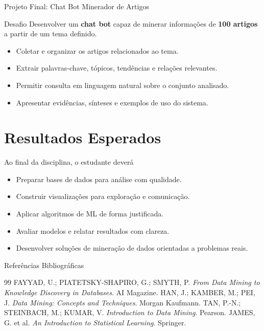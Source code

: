 \documentclass[aspectratio=169]{beamer}
\begin{document}
\begin{frame}{Projeto Final: Chat Bot Minerador de Artigos}
    \small
    \begin{alertblock}{Desafio}
        Desenvolver um \textbf{chat bot} capaz de minerar informações de \textbf{100 artigos} a partir de um tema definido.
    \end{alertblock}

    \begin{itemize}
        \item Coletar e organizar os artigos relacionados ao tema.
        \item Extrair palavras-chave, tópicos, tendências e relações relevantes.
        \item Permitir consulta em linguagem natural sobre o conjunto analisado.
        \item Apresentar evidências, sínteses e exemplos de uso do sistema.
    \end{itemize}
\end{frame}

\section{Resultados Esperados}

\begin{frame}{Ao final da disciplina, o estudante deverá}
    \begin{itemize}
        \item Preparar bases de dados para análise com qualidade.
        \item Construir visualizações para exploração e comunicação.
        \item Aplicar algoritmos de ML de forma justificada.
        \item Avaliar modelos e relatar resultados com clareza.
        \item Desenvolver soluções de mineração de dados orientadas a problemas reais.
    \end{itemize}
\end{frame}

\begin{frame}{Referências Bibliográficas}
    \begin{thebibliography}{99}
         FAYYAD, U.; PIATETSKY-SHAPIRO, G.; SMYTH, P. \textit{From Data Mining to Knowledge Discovery in Databases}. AI Magazine.
         HAN, J.; KAMBER, M.; PEI, J. \textit{Data Mining: Concepts and Techniques}. Morgan Kaufmann.
         TAN, P.-N.; STEINBACH, M.; KUMAR, V. \textit{Introduction to Data Mining}. Pearson.
         JAMES, G. et al. \textit{An Introduction to Statistical Learning}. Springer.
    \end{thebibliography}
\end{frame}
\end{document}
